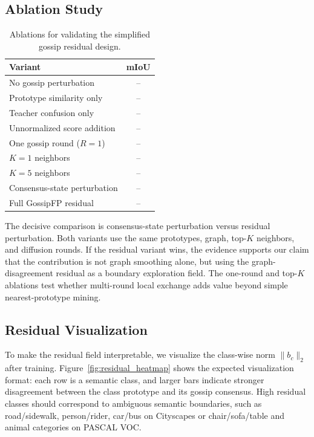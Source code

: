 \documentclass[10pt,twocolumn,letterpaper]{article}
\begin{document}
\subsection{Ablation Study}

\begin{table}[t]
\centering
\caption{Ablations for validating the simplified gossip residual design.}
\label{tab:ablation}
\begin{tabular}{lc}
\toprule
Variant & mIoU \\
\midrule
No gossip perturbation & -- \\
Prototype similarity only & -- \\
Teacher confusion only & -- \\
Unnormalized score addition & -- \\
One gossip round ($R=1$) & -- \\
$K=1$ neighbors & -- \\
$K=5$ neighbors & -- \\
Consensus-state perturbation & -- \\
Full GossipFP residual & -- \\
\bottomrule
\end{tabular}
\end{table}

The decisive comparison is consensus-state perturbation versus residual perturbation. Both variants use the same prototypes, graph, top-$K$ neighbors, and diffusion rounds. If the residual variant wins, the evidence supports our claim that the contribution is not graph smoothing alone, but using the graph-disagreement residual as a boundary exploration field. The one-round and top-$K$ ablations test whether multi-round local exchange adds value beyond simple nearest-prototype mining.

\subsection{Residual Visualization}

To make the residual field interpretable, we visualize the class-wise norm $\|b_c\|_2$ after training. Figure~\ref{fig:residual_heatmap} shows the expected visualization format: each row is a semantic class, and larger bars indicate stronger disagreement between the class prototype and its gossip consensus. High residual classes should correspond to ambiguous semantic boundaries, such as road/sidewalk, person/rider, car/bus on Cityscapes or chair/sofa/table and animal categories on PASCAL VOC.
\end{document}
